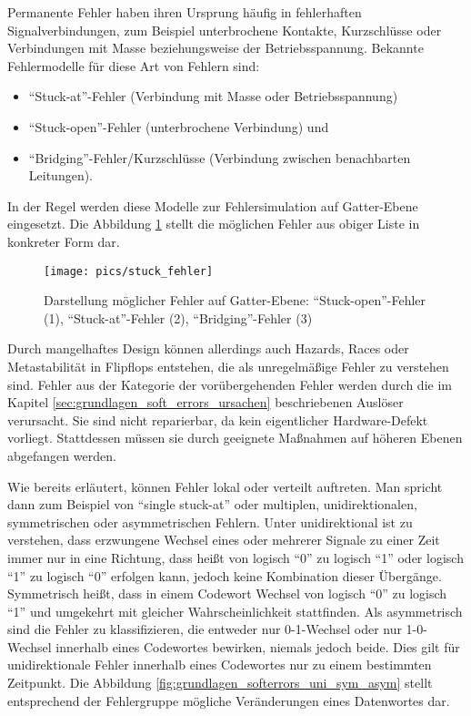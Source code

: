 Permanente Fehler haben ihren Ursprung häufig in fehlerhaften
Signalverbindungen, zum Beispiel unterbrochene Kontakte, Kurzschlüsse
oder Verbindungen mit Masse beziehungsweise der
Betriebsspannung. Bekannte Fehlermodelle für diese Art von Fehlern
sind:
\begin{itemize}
\item ``Stuck-at''-Fehler (Verbindung mit Masse oder Betriebsspannung)
\item ``Stuck-open''-Fehler (unterbrochene Verbindung) und
\item ``Bridging''-Fehler/Kurzschlüsse (Verbindung zwischen benachbarten Leitungen).
\end{itemize}
In der Regel werden diese Modelle zur Fehlersimulation auf
Gatter-Ebene eingesetzt. Die Abbildung
\ref{fig:grundlagen_fehlermodelle_stuckfehler} stellt die möglichen
Fehler aus obiger Liste in konkreter Form dar.

\begin{figure}[htbp]
	\centering
		\texttt{[image: pics/stuck\_fehler]}
	\caption[Darstellung möglicher Fehler auf
        Gatter-Ebene]{Darstellung möglicher Fehler auf Gatter-Ebene:
          ``Stuck-open''-Fehler (1), ``Stuck-at''-Fehler (2),
          ``Bridging''-Fehler (3)}
	\label{fig:grundlagen_fehlermodelle_stuckfehler}
\end{figure}

Durch mangelhaftes Design können allerdings auch Hazards, Races oder
Metastabilität in Flipflops entstehen, die als  unregelmäßige Fehler
zu verstehen sind. Fehler aus der Kategorie der vorübergehenden Fehler
werden durch die im Kapitel \ref{sec:grundlagen_soft_errors_ursachen}
beschriebenen Auslöser verursacht. Sie sind nicht reparierbar, da kein
eigentlicher Hardware-Defekt vorliegt. Stattdessen müssen sie durch
geeignete Maßnahmen auf höheren Ebenen abgefangen werden.

Wie bereits erläutert, können Fehler lokal oder verteilt
auftreten. Man spricht dann zum Beispiel von ``single stuck-at'' oder
multiplen, unidirektionalen, symmetrischen oder asymmetrischen
Fehlern. Unter unidirektional ist zu verstehen, dass erzwungene 
Wechsel eines oder mehrerer Signale zu einer Zeit immer nur in eine
Richtung, dass heißt von logisch ``0'' zu logisch ``1'' oder logisch
``1'' zu logisch ``0'' erfolgen kann, jedoch keine Kombination dieser
Übergänge. Symmetrisch heißt, dass in einem Codewort Wechsel von
logisch ``0'' zu logisch ``1'' und umgekehrt mit gleicher
Wahrscheinlichkeit stattfinden. Als asymmetrisch sind die Fehler zu
klassifizieren, die entweder nur 0-1-Wechsel oder nur 1-0-Wechsel
innerhalb eines Codewortes bewirken, niemals jedoch beide. Dies gilt
für unidirektionale Fehler innerhalb eines Codewortes nur zu einem
bestimmten Zeitpunkt. Die Abbildung
\ref{fig:grundlagen_softerrors_uni_sym_asym} stellt entsprechend der
Fehlergruppe mögliche Veränderungen eines Datenwortes dar.

